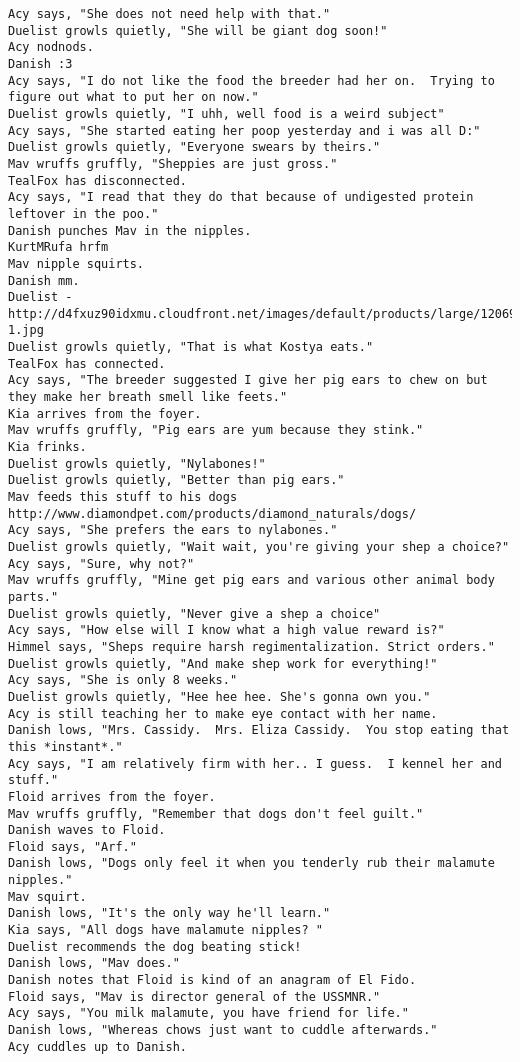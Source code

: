 \begin{verbatim}
Acy says, "She does not need help with that."
Duelist growls quietly, "She will be giant dog soon!"
Acy nodnods.
Danish :3
Acy says, "I do not like the food the breeder had her on.  Trying to figure out what to put her on now."
Duelist growls quietly, "I uhh, well food is a weird subject"
Acy says, "She started eating her poop yesterday and i was all D:"
Duelist growls quietly, "Everyone swears by theirs."
Mav wruffs gruffly, "Sheppies are just gross."
TealFox has disconnected.
Acy says, "I read that they do that because of undigested protein leftover in the poo."
Danish punches Mav in the nipples.
KurtMRufa hrfm
Mav nipple squirts.
Danish mm.
Duelist - http://d4fxuz90idxmu.cloudfront.net/images/default/products/large/12069-1.jpg
Duelist growls quietly, "That is what Kostya eats."
TealFox has connected.
Acy says, "The breeder suggested I give her pig ears to chew on but they make her breath smell like feets."
Kia arrives from the foyer.
Mav wruffs gruffly, "Pig ears are yum because they stink."
Kia frinks.
Duelist growls quietly, "Nylabones!"
Duelist growls quietly, "Better than pig ears."
Mav feeds this stuff to his dogs http://www.diamondpet.com/products/diamond_naturals/dogs/
Acy says, "She prefers the ears to nylabones."
Duelist growls quietly, "Wait wait, you're giving your shep a choice?"
Acy says, "Sure, why not?"
Mav wruffs gruffly, "Mine get pig ears and various other animal body parts."
Duelist growls quietly, "Never give a shep a choice"
Acy says, "How else will I know what a high value reward is?"
Himmel says, "Sheps require harsh regimentalization. Strict orders."
Duelist growls quietly, "And make shep work for everything!"
Acy says, "She is only 8 weeks."
Duelist growls quietly, "Hee hee hee. She's gonna own you."
Acy is still teaching her to make eye contact with her name.
Danish lows, "Mrs. Cassidy.  Mrs. Eliza Cassidy.  You stop eating that this *instant*."
Acy says, "I am relatively firm with her.. I guess.  I kennel her and stuff."
Floid arrives from the foyer.
Mav wruffs gruffly, "Remember that dogs don't feel guilt."
Danish waves to Floid.
Floid says, "Arf."
Danish lows, "Dogs only feel it when you tenderly rub their malamute nipples."
Mav squirt.
Danish lows, "It's the only way he'll learn."
Kia says, "All dogs have malamute nipples? "
Duelist recommends the dog beating stick!
Danish lows, "Mav does."
Danish notes that Floid is kind of an anagram of El Fido.
Floid says, "Mav is director general of the USSMNR."
Acy says, "You milk malamute, you have friend for life."
Danish lows, "Whereas chows just want to cuddle afterwards."
Acy cuddles up to Danish.

\end{verbatim}
